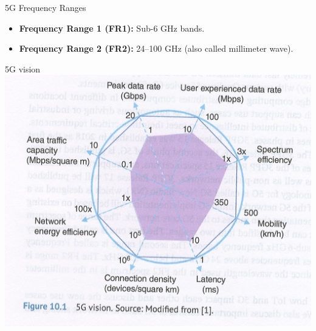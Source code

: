 \documentclass{beamer}
\begin{document}
\begin{frame}{5G Frequency Ranges}
  \begin{itemize}
      \item \textbf{Frequency Range 1 (FR1):} Sub-6 GHz bands.
      \vspace*{0.75em}
      \item \textbf{Frequency Range 2 (FR2):} 24–100 GHz (also called millimeter wave).
  \end{itemize}
\end{frame}



\begin{frame}{5G vision}
  \hspace*{0.4em}
  \includegraphics[scale=0.5]{fig/5g-vision-fig-10-1.png}
\end{frame}
\end{document}
